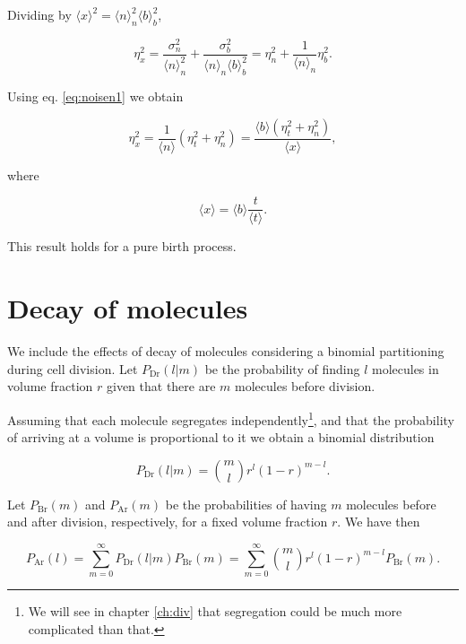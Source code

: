 Dividing by $\langle x\rangle^2=\langle n\rangle_n^2\langle b\rangle_b^2$,

\begin{equation*}
  \eta_x^2=\frac{\sigma_n^2}{\langle n\rangle_n^2} + \frac{\sigma_b^2}{\langle n\rangle_n\langle b\rangle_b^2} = \eta_n^2+\frac{1}{\langle n\rangle_n}\eta_b^2.
\end{equation*}

Using eq. \ref{eq:noisen1} we obtain

\begin{equation}
  \label{eq:noisex}
  \eta_x^2=\frac{1}{\langle n\rangle}\left(\eta_t^2+\eta_n^2\right)=\frac{\langle b\rangle\left(\eta_t^2+\eta_n^2\right)}{\langle x\rangle},
\end{equation}

where

\begin{equation}
  \langle x\rangle = \langle b\rangle\frac{t}{\langle t\rangle}.
\end{equation}

This result holds for a pure birth process.

\section{Decay of molecules}

We include the effects of decay of molecules considering a binomial partitioning during cell division. Let $P_\text{Dr}(l|m)$ be the probability of finding $l$ molecules in volume fraction $r$ given that there are $m$ molecules before division.

Assuming that each molecule segregates independently\footnote{We will see in chapter \ref{ch:div} that segregation could be much more complicated than that.}, and that the probability of arriving at a volume is proportional to it we obtain a binomial distribution

\begin{equation}
  P_\text{Dr}(l|m) = {m\choose l}r^l(1-r)^{m-l}.
\end{equation}

Let $P_\text{Br}(m)$ and $P_\text{Ar}(m)$ be the probabilities of having $m$ molecules before and after division, respectively, for a fixed volume fraction $r$. We have then

\begin{equation}
  P_\text{Ar}(l) = \sum_{m=0}^\infty P_\text{Dr}(l|m)P_\text{Br}(m) = \sum_{m=0}^\infty {m\choose l}r^l(1-r)^{m-l}P_\text{Br}(m).
\end{equation}

